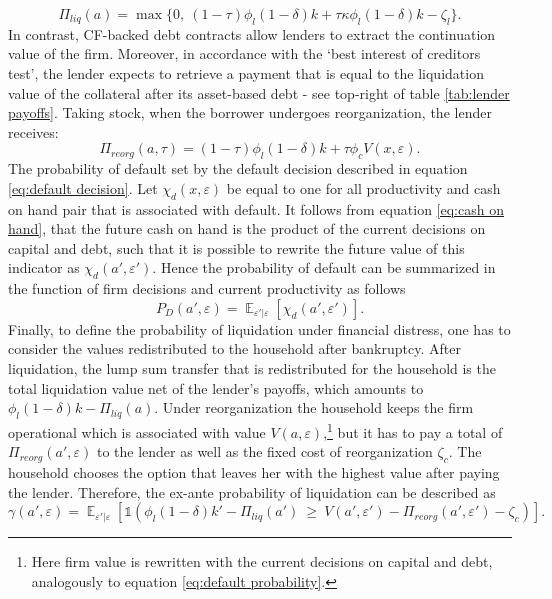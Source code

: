 \documentclass[12pt]{article}
\DeclareMathOperator{\E}{\mathbb{E}}
\begin{document}
\begin{equation} \label{eq:P_liq} 
   \Pi_{liq}(a) = \max \{0, \ (1-\tau) \phi_l (1-\delta) k +\tau \kappa \phi_l  (1-\delta) k - \zeta_l \}. 
\end{equation}
In contrast, CF-backed debt contracts allow lenders to extract the continuation value of the firm. Moreover, in accordance with the `best interest of creditors test', the lender expects to retrieve a payment that is equal to the liquidation value of the collateral after its asset-based debt - see top-right of table \ref{tab:lender payoffs}. Taking stock, when the borrower undergoes reorganization, the lender receives:
\begin{equation}  \label{eq:P_reorg}
   \Pi_{reorg}(a,\tau) = (1-\tau) \phi_l (1-\delta) k +\tau \phi_c V (x, \varepsilon).
\end{equation}
The probability of default set by the default decision described in equation \ref{eq:default decision}. Let $\chi_d(x,\varepsilon)$ be equal to one for all productivity and cash on hand pair that is associated with default. It follows from equation \ref{eq:cash on hand}, that the future cash on hand is the product of the current decisions on capital and debt, such that it is possible to rewrite the future value of this indicator as $\chi_d(a',\varepsilon')$. Hence the probability of default can be summarized in the function of firm decisions and current productivity as follows
\begin{equation} \label{eq:default probability}
    P_D(a',\varepsilon) = \E_{\varepsilon'|\varepsilon}[\chi_d(a',\varepsilon')].
\end{equation}
Finally, to define the probability of liquidation under financial distress, one has to consider the values redistributed to the household after bankruptcy. After liquidation, the lump sum transfer that is redistributed for the household is the total liquidation value net of the lender's payoffs, which amounts to $\phi_l(1-\delta)k - \Pi_{liq}(a)$. Under reorganization the household keeps the firm operational which is associated with value $V(a,\varepsilon)$,\footnote{Here firm value is rewritten with the current decisions on capital and debt, analogously to equation \ref{eq:default probability}.}  but it has to pay a total of $\Pi_{reorg}(a', \varepsilon)$ to the lender as well as the fixed cost of reorganization $\zeta_c$. The household chooses the option that leaves her with the highest value after paying the lender. Therefore, the ex-ante probability of liquidation can be described as
\begin{equation} \label{eq:liquidation probability}
    \gamma(a',\varepsilon) = \E_{\varepsilon'|\varepsilon}[\mathds{1}(\phi_l(1-\delta)k' - \Pi_{liq}(a')  \  \geq \ V(a',\varepsilon') - \Pi_{reorg}(a', \varepsilon') - \zeta_c)].
\end{equation}
\end{document}
